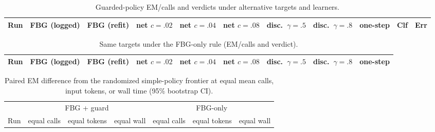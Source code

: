 \documentclass[manuscript,nonacm]{acmart}
\begin{document}
\begin{table}[htbp]
\caption{Guarded-policy EM/calls and verdicts under alternative targets and
learners.}
\label{tab:supp-targets}
\footnotesize
\setlength{\tabcolsep}{2.5pt}
\begin{tabular}{lrrrrrrrrrr}
\toprule
Run & FBG (logged) & FBG (refit) & net $c{=}.02$ & net $c{=}.04$ & net $c{=}.08$ & disc.\ $\gamma{=}.5$ & disc.\ $\gamma{=}.8$ & one-step & Clf & Err \\
\midrule

\bottomrule
\end{tabular}
\end{table}

\begin{table}[htbp]
\caption{Same targets under the FBG-only rule (EM/calls and verdict).}
\label{tab:supp-targets-value}
\footnotesize
\setlength{\tabcolsep}{3pt}
\begin{tabular}{lrrrrrrrr}
\toprule
Run & FBG (logged) & FBG (refit) & net $c{=}.02$ & net $c{=}.04$ & net $c{=}.08$ & disc.\ $\gamma{=}.5$ & disc.\ $\gamma{=}.8$ & one-step \\
\midrule

\bottomrule
\end{tabular}
\end{table}

\begin{table}[htbp]
\caption{Paired EM difference from the randomized simple-policy frontier at
equal mean calls, input tokens, or wall time (95\% bootstrap CI).}
\label{tab:supp-equalcost}
\footnotesize
\setlength{\tabcolsep}{3pt}
\begin{tabular}{lrrrrrr}
\toprule
& \multicolumn{3}{c}{FBG + guard} & \multicolumn{3}{c}{FBG-only} \\
\cmidrule(lr){2-4}\cmidrule(lr){5-7}
Run & equal calls & equal tokens & equal wall & equal calls & equal tokens & equal wall \\
\midrule

\bottomrule
\end{tabular}
\end{table}
\end{document}
